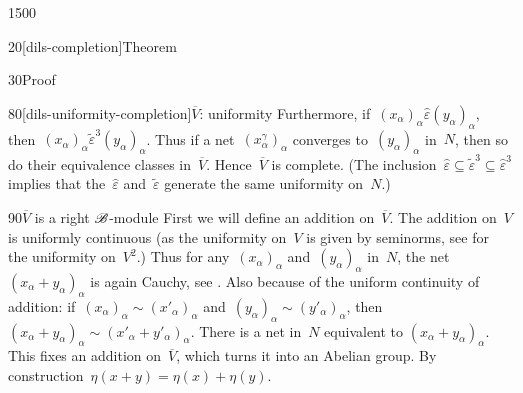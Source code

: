 \begin{parsec}{1500}
\begin{point}{20}[dils-completion]{Theorem}
\begin{point}{30}{Proof}
\begin{point}{80}[dils-uniformity-completion]{$\overline{V}$: uniformity}
Furthermore, if~$(x_\alpha)_\alpha \mathrel{\hat\varepsilon}
(y_\alpha)_\alpha $,
then~$(x_\alpha)_\alpha \mathrel{\tilde\varepsilon^3} (y_\alpha)_\alpha$.
Thus if a net~$(x^\gamma_\alpha)_\alpha$
converges to~$(y_\alpha)_\alpha$ in~$N$,
then so do their equivalence classes in~$\overline{V}$.
Hence~$\overline{V}$ is complete.
(The inclusion~$\hat\varepsilon \subseteq \tilde\varepsilon^3 \subseteq
        \hat\varepsilon^3$
        implies that the~$\hat\varepsilon$ and~$\tilde\varepsilon$
        generate the same uniformity on~$N$.)
\end{point}
\begin{point}{90}{$\overline{V}$ is a right $\mathscr{B}$-module}%
    First we will define an addition on~$\overline{V}$.
    The addition on~$V$ is uniformly continuous
    (as the uniformity on~$V$ is given by seminorms,
    see  for the uniformity on~$V^2$.)
    Thus for any~$(x_\alpha)_\alpha$
    and~$(y_\alpha)_\alpha$ in~$N$,
    the net~$(x_\alpha+y_\alpha)_\alpha$ is again Cauchy,
        see .
    Also because of the uniform continuity of addition:
    if~$(x_\alpha)_\alpha \sim (x'_\alpha)_\alpha$
    and~$(y_\alpha)_\alpha \sim (y'_\alpha)_\alpha$,
    then~$(x_\alpha+y_\alpha)_\alpha \sim
            (x'_\alpha+y'_\alpha)_\alpha$.
    There is a net in~$N$ equivalent to $(x_\alpha+y_\alpha)_\alpha$.
    This fixes an addition on~$\overline{V}$,
        which turns it into an Abelian group.
        By construction~$\eta(x+y) = \eta(x)+\eta(y)$.


\end{point}
\end{point}
\end{point}
\end{parsec}
